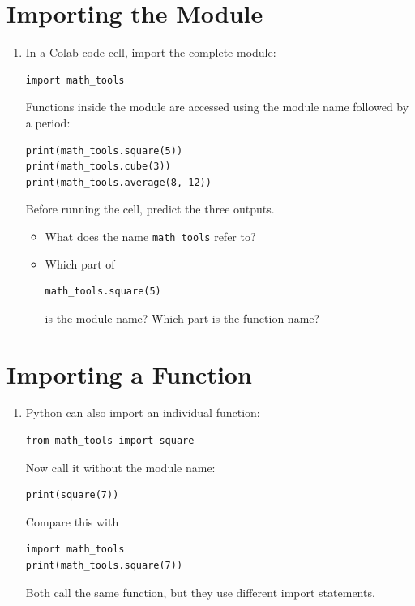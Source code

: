 \documentclass{article}
\begin{document}
\section{Importing the Module}

\begin{enumerate}

\item In a Colab code cell, import the complete module:

\begin{verbatim}
import math_tools
\end{verbatim}

Functions inside the module are accessed using the module name
followed by a period:

\begin{verbatim}
print(math_tools.square(5))
print(math_tools.cube(3))
print(math_tools.average(8, 12))
\end{verbatim}

Before running the cell, predict the three outputs.

\begin{itemize}

\item What does the name \texttt{math\_tools} refer to?

\item Which part of

\begin{verbatim}
math_tools.square(5)
\end{verbatim}

is the module name?  Which part is the function name?

\end{itemize}

\end{enumerate}


\section{Importing a Function}

\begin{enumerate}

\item Python can also import an individual function:

\begin{verbatim}
from math_tools import square
\end{verbatim}

Now call it without the module name:

\begin{verbatim}
print(square(7))
\end{verbatim}

Compare this with

\begin{verbatim}
import math_tools
print(math_tools.square(7))
\end{verbatim}

Both call the same function, but they use different import
statements.

\end{enumerate}
\end{document}
